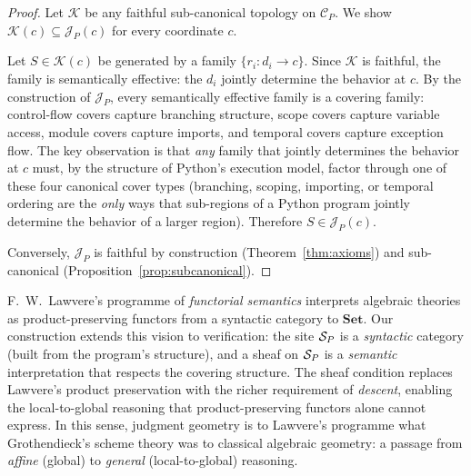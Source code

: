 \documentclass[11pt]{article}
\begin{document}
\begin{proof}
Let $\mathscr{K}$ be any faithful sub-canonical topology on
$\mathcal{C}_P$.  We show $\mathscr{K}(c) \subseteq \mathscr{J}_P(c)$
for every coordinate $c$.

Let $S \in \mathscr{K}(c)$ be generated by a family
$\{r_i : d_i \to c\}$.  Since $\mathscr{K}$ is faithful, the family
is semantically effective: the $d_i$ jointly determine the behavior
at $c$.  By the construction of $\mathscr{J}_P$, every semantically
effective family is a covering family: control-flow covers capture
branching structure, scope covers capture variable access, module
covers capture imports, and temporal covers capture exception flow.
The key observation is that \emph{any} family that jointly determines
the behavior at $c$ must, by the structure of Python's execution
model, factor through one of these four canonical cover types
(branching, scoping, importing, or temporal ordering are the
\emph{only} ways that sub-regions of a Python program jointly
determine the behavior of a larger region).
Therefore $S \in \mathscr{J}_P(c)$.

Conversely, $\mathscr{J}_P$ is faithful by construction
(Theorem~\ref{thm:axioms}) and sub-canonical
(Proposition~\ref{prop:subcanonical}).
\end{proof}

\begin{remark}
F.~W.~Lawvere's programme of \emph{functorial semantics}
\cite{Lawvere1963} interprets algebraic theories as product-preserving
functors from a syntactic category to $\mathbf{Set}$.  Our construction
extends this vision to verification: the site $\mathcal{S}_P$ is a
\emph{syntactic} category (built from the program's structure), and
a sheaf on $\mathcal{S}_P$ is a \emph{semantic} interpretation that
respects the covering structure.  The sheaf condition replaces
Lawvere's product preservation with the richer requirement of
\emph{descent}, enabling the local-to-global reasoning that
product-preserving functors alone cannot express.  In this sense,
judgment geometry is to Lawvere's programme what Grothendieck's
scheme theory was to classical algebraic geometry: a passage from
\emph{affine} (global) to \emph{general} (local-to-global)
reasoning.
\end{remark}
\end{document}
